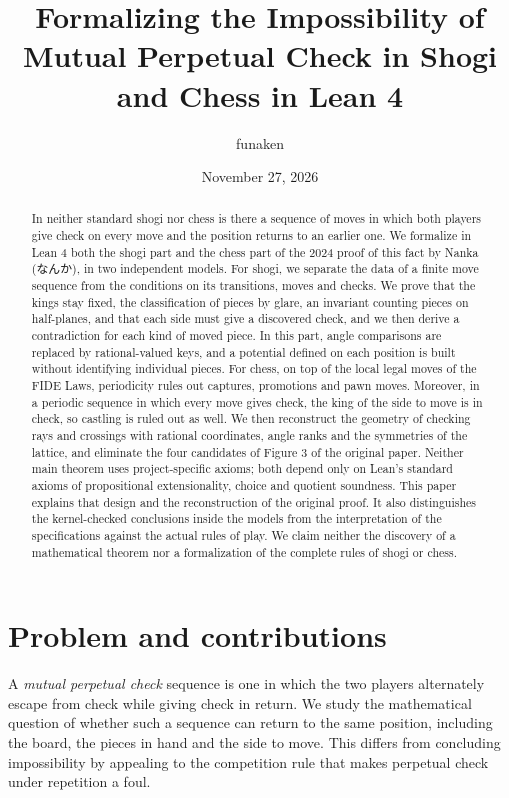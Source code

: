 \documentclass[a4paper,11pt]{article}
\title{Formalizing the Impossibility of\\Mutual Perpetual Check in Shogi and Chess in Lean 4}
\author{funaken}
\date{November 27, 2026}
\theoremstyle{definition}
\begin{document}
\maketitle
\begin{abstract}
In neither standard shogi nor chess is there a sequence of moves in which both players give check on every move and the position returns to an earlier one.
We formalize in Lean 4 both the shogi part and the chess part of the 2024 proof of this fact by Nanka (なんか), in two independent models.
For shogi, we separate the data of a finite move sequence from the conditions on its transitions, moves and checks.
We prove that the kings stay fixed, the classification of pieces by glare, an invariant counting pieces on half-planes, and that each side must give a discovered check, and we then derive a contradiction for each kind of moved piece.
In this part, angle comparisons are replaced by rational-valued keys, and a potential defined on each position is built without identifying individual pieces.
For chess, on top of the local legal moves of the FIDE Laws, periodicity rules out captures, promotions and pawn moves.
Moreover, in a periodic sequence in which every move gives check, the king of the side to move is in check, so castling is ruled out as well.
We then reconstruct the geometry of checking rays and crossings with rational coordinates, angle ranks and the symmetries of the lattice, and eliminate the four candidates of Figure 3 of the original paper.
Neither main theorem uses project-specific axioms; both depend only on Lean's standard axioms of propositional extensionality, choice and quotient soundness.
This paper explains that design and the reconstruction of the original proof.
It also distinguishes the kernel-checked conclusions inside the models from the interpretation of the specifications against the actual rules of play.
We claim neither the discovery of a mathematical theorem nor a formalization of the complete rules of shogi or chess.
\end{abstract}

\section{Problem and contributions}
A \emph{mutual perpetual check} sequence is one in which the two players alternately escape from check while giving check in return.
We study the mathematical question of whether such a sequence can return to the same position, including the board, the pieces in hand and the side to move.
This differs from concluding impossibility by appealing to the competition rule that makes perpetual check under repetition a foul.
\end{document}
